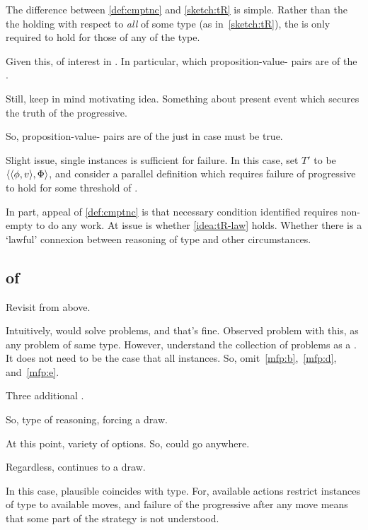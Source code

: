\begin{note}
  The difference between \autoref{def:cmptnc} and \autoref{sketch:tR} is simple.
  Rather than the the \itc{} holding with respect to \emph{all} \tI{} of some type (as in~\autoref{sketch:tR}), the \itc{} is only required to hold for those  of any \emph{} of the type.

  Given this, of interest in .
  In particular, which proposition-value-\pool{} pairs are  of the .

  Still, keep in mind motivating idea.
  Something about present event which secures the truth of the progressive.

  So, proposition-value-\pool{} pairs are  of the  just in case \itc{} must be true.
\end{note}

\begin{note}
  Slight issue, single instances is sufficient for failure.
  In this case, set \(T'\) to be \(\langle \langle \phi, v \rangle, \Phi \rangle\), and consider a parallel definition which requires failure of progressive to hold for some threshold of \tI{}.

  In part, appeal of \autoref{def:cmptnc} is that necessary condition identified requires non-empty \tRep{} to do any work.
  At issue is whether \autoref{idea:tR-law} holds.
  Whether there is a `lawful' connexion between reasoning of type and other circumstances.
\end{note}

\subsection{ of \tR{}}
\label{sec:illu3}

\begin{note}
  Revisit  from above.

  Intuitively, would solve problems, and that's fine.
  Observed problem with this, as any problem of same type.
  However, understand the collection of problems as a .
  It does not need to be the case that all instances.
  So, omit~\ref{mfp:b},~\ref{mfp:d}, and~\ref{mfp:e}.
\end{note}

\begin{note}
  Three additional .
\end{note}

\begin{note}
  \begin{illustration}
    So, type of reasoning, forcing a draw.

    At this point, variety of options.
    So, could go anywhere.

    Regardless, continues to a draw.
  \end{illustration}

  In this case, \rotor{} plausible coincides with type.
  For, available actions restrict instances of type to available moves, and failure of the progressive after any move means that some part of the strategy is not understood.
\end{note}


